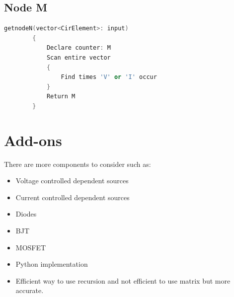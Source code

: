 \documentclass[a4paper, titlepage]{article}
\begin{document}
    \subsection{Node M}
    \begin{lstlisting}[language=C++]
        getnodeN(vector<CirElement>: input)
        {
            Declare counter: M
            Scan entire vector
            {
                Find times 'V' or 'I' occur
            }
            Return M
        }
    \end{lstlisting}

    \pagebreak
    \section{Add-ons}
    There are more components to consider such as:
    \begin{itemize}
        \item Voltage controlled dependent sources
        \item Current controlled dependent sources
        \item Diodes
        \item BJT
        \item MOSFET
        \item Python implementation
        \item Efficient way to use recursion and not efficient to use matrix but more accurate.
    \end{itemize}
    
    \pagebreak
    \printbibliography[title={References}]
\end{document}
